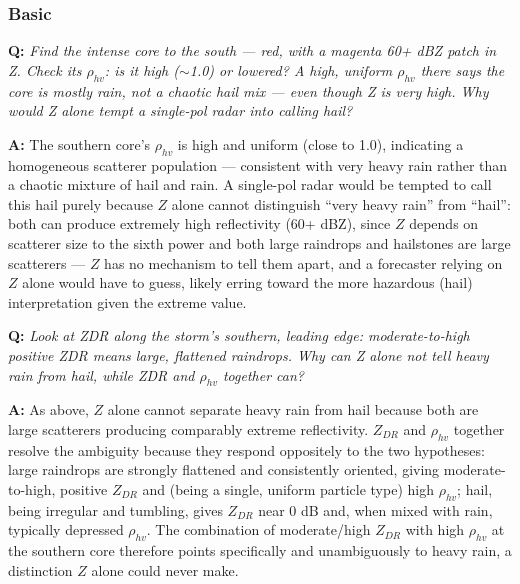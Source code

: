 \documentclass[11pt]{article}
\newenvironment{qa}[1]{\par\noindent\textbf{\color{qgray}Q: }\emph{#1}\par\noindent\textbf{A: }}{\par\vspace{6pt}}
\newcommand{\tier}[1]{\subsubsection*{#1}}
\begin{document}
\tier{Basic}
\begin{qa}{Find the intense core to the south --- red, with a magenta 60+ dBZ patch in Z. Check its $\rho_{hv}$: is it high ($\sim$1.0) or lowered? A high, uniform $\rho_{hv}$ there says the core is mostly rain, not a chaotic hail mix --- even though Z is very high. Why would Z alone tempt a single-pol radar into calling hail?}
The southern core's $\rho_{hv}$ is high and uniform (close to 1.0), indicating a homogeneous scatterer population --- consistent with very heavy rain rather than a chaotic mixture of hail and rain. A single-pol radar would be tempted to call this hail purely because $Z$ alone cannot distinguish ``very heavy rain'' from ``hail'': both can produce extremely high reflectivity (60+ dBZ), since $Z$ depends on scatterer size to the sixth power and both large raindrops and hailstones are large scatterers --- $Z$ has no mechanism to tell them apart, and a forecaster relying on $Z$ alone would have to guess, likely erring toward the more hazardous (hail) interpretation given the extreme value.
\end{qa}
\begin{qa}{Look at ZDR along the storm's southern, leading edge: moderate-to-high positive ZDR means large, flattened raindrops. Why can Z alone not tell heavy rain from hail, while ZDR and $\rho_{hv}$ together can?}
As above, $Z$ alone cannot separate heavy rain from hail because both are large scatterers producing comparably extreme reflectivity. $Z_{DR}$ and $\rho_{hv}$ together resolve the ambiguity because they respond oppositely to the two hypotheses: large raindrops are strongly flattened and consistently oriented, giving moderate-to-high, positive $Z_{DR}$ and (being a single, uniform particle type) high $\rho_{hv}$; hail, being irregular and tumbling, gives $Z_{DR}$ near 0 dB and, when mixed with rain, typically depressed $\rho_{hv}$. The combination of moderate/high $Z_{DR}$ with high $\rho_{hv}$ at the southern core therefore points specifically and unambiguously to heavy rain, a distinction $Z$ alone could never make.
\end{qa}
\end{document}
